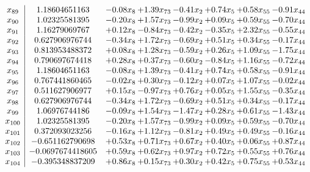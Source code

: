 \documentclass[8pt]{article}
\begin{document}
\[\begin{array}{c| c c@{\hskip 2pt} c@{\hskip 2pt} c@{\hskip 2pt} c@{\hskip 2pt} c@{\hskip 2pt} c@{\hskip 2pt} }
 x_{89}   &  1.18604651163 & -0.08 x_{8} & +  1.39 x_{73} & -0.41 x_{2} & +  0.74 x_{5} & +  0.58 x_{55} & -0.91 x_{44}\\
 x_{90}   &  1.02325581395 & -0.20 x_{8} & +  1.57 x_{73} & -0.99 x_{2} & +  0.09 x_{5} & +  0.59 x_{55} & -0.70 x_{44}\\
 x_{91}   &  1.16279069767 & +  0.12 x_{8} & -0.84 x_{73} & -0.42 x_{2} & -0.35 x_{5} & +  2.32 x_{55} & -0.55 x_{44}\\
 x_{92}   &  0.627906976744 & -0.34 x_{8} & +  1.72 x_{73} & -0.69 x_{2} & +  0.51 x_{5} & +  0.34 x_{55} & -0.17 x_{44}\\
 x_{93}   &  0.813953488372 & +  0.08 x_{8} & +  1.28 x_{73} & -0.59 x_{2} & +  0.26 x_{5} & +  1.09 x_{55} & -1.75 x_{44}\\
 x_{94}   &  0.790697674418 & +  0.28 x_{8} & +  0.37 x_{73} & -0.60 x_{2} & -0.84 x_{5} & +  1.16 x_{55} & -0.72 x_{44}\\
 x_{95}   &  1.18604651163 & -0.08 x_{8} & +  1.39 x_{73} & -0.41 x_{2} & +  0.74 x_{5} & +  0.58 x_{55} & -0.91 x_{44}\\
 x_{96}   &  0.767441860465 & -0.02 x_{8} & +  0.30 x_{73} & -0.12 x_{2} & +  0.07 x_{5} & +  1.07 x_{55} & -0.02 x_{44}\\
 x_{97}   &  0.511627906977 & +  0.15 x_{8} & -0.97 x_{73} & +  0.76 x_{2} & +  0.05 x_{5} & +  1.55 x_{55} & -0.35 x_{44}\\
 x_{98}   &  0.627906976744 & -0.34 x_{8} & +  1.72 x_{73} & -0.69 x_{2} & +  0.51 x_{5} & +  0.34 x_{55} & -0.17 x_{44}\\
 x_{99}   &  1.06976744186 & -0.09 x_{8} & +  1.54 x_{73} & -1.47 x_{2} & +  0.28 x_{5} & +  0.61 x_{55} & -1.43 x_{44}\\
 x_{100}   &  1.02325581395 & -0.20 x_{8} & +  1.57 x_{73} & -0.99 x_{2} & +  0.09 x_{5} & +  0.59 x_{55} & -0.70 x_{44}\\
 x_{101}   &  0.372093023256 & -0.16 x_{8} & +  1.12 x_{73} & -0.81 x_{2} & +  0.49 x_{5} & +  0.49 x_{55} & -0.16 x_{44}\\
 x_{102}   &  -0.651162790698 & +  0.53 x_{8} & +  0.71 x_{73} & +  0.67 x_{2} & +  0.40 x_{5} & +  0.06 x_{55} & +  0.87 x_{44}\\
 x_{103}   &  -0.0697674418605 & +  0.59 x_{8} & +  0.62 x_{73} & +  0.97 x_{2} & +  0.72 x_{5} & +  0.55 x_{55} & +  0.76 x_{44}\\
 x_{104}   &  -0.395348837209 & +  0.86 x_{8} & +  0.15 x_{73} & +  0.30 x_{2} & +  0.42 x_{5} & +  0.75 x_{55} & +  0.53 x_{44}\\

\end{array}\]
\end{document}
